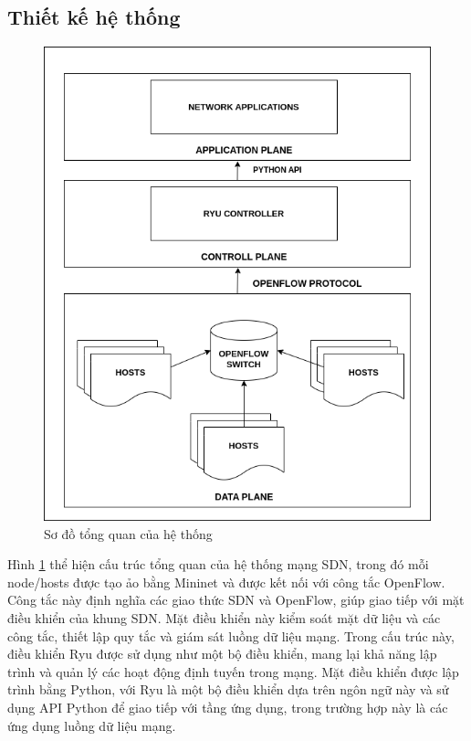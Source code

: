 \documentclass[a4paper]{article}
\begin{document}
\subsection{Thiết kế hệ thống}
\begin{figure}
    \centering
    \includegraphics[width=0.7\linewidth]{images/result/Sodohethong.png}
    \caption{Sơ đồ tổng quan của hệ thống}
    \label{fig:sodohethong}
\end{figure} 
Hình \ref{fig:sodohethong} thể hiện cấu trúc tổng quan của hệ thống mạng SDN, trong đó mỗi node/hosts được tạo ảo bằng Mininet và được kết nối với công tắc OpenFlow. Công tắc này định nghĩa các giao thức SDN và OpenFlow, giúp giao tiếp với mặt điều khiển của khung SDN. Mặt điều khiển này kiểm soát mặt dữ liệu và các công tắc, thiết lập quy tắc và giám sát luồng dữ liệu mạng. Trong cấu trúc này, điều khiển Ryu được sử dụng như một bộ điều khiển, mang lại khả năng lập trình và quản lý các hoạt động định tuyến trong mạng. Mặt điều khiển được lập trình bằng Python, với Ryu là một bộ điều khiển dựa trên ngôn ngữ này và sử dụng API Python để giao tiếp với tầng ứng dụng, trong trường hợp này là các ứng dụng luồng dữ liệu mạng.
\end{document}
